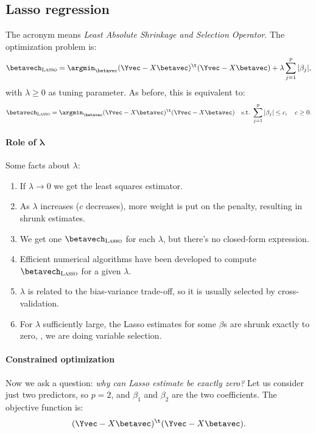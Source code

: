 \subsection{Lasso regression}

The acronym means \emph{Least Absolute Shrinkage and Selection Operator}. The optimization problem is:
\begin{equation}
    \betavech_{\textsc{Lasso}} = \argmin_{\betavec} {(\Yvec - X\betavec)^\t (\Yvec - X\betavec) + \lambda \sum_{j=1}^p |\beta_j|},
\end{equation}
with $\lambda \geq 0$ as tuning parameter. As before, this is equivalent to:
\begin{equation}
    \betavech_{\textsc{Lasso}} = \argmin_{\betavec} {(\Yvec - X\betavec)^\t (\Yvec - X\betavec)}\quad \text{s.t.\@ } \sum_{j=1}^p |\beta_j| \leq c, \quad c \geq 0.
\end{equation}

\paragraph{Role of $\bm{\lambda}$}

Some facts about $\lambda$:
\begin{enumerate}
    \item If $\lambda \to 0$ we get the least squares estimator.
    \item As $\lambda$ increases ($c$ decreases), more weight is put on the penalty, resulting in shrunk estimates.
    \item We get one $\betavech_{\textsc{Lasso}}$ for each $\lambda$, but there's no closed-form expression.
    \item Efficient numerical algorithms have been developed to compute $\betavech_{\textsc{Lasso}}$ for a given $\lambda$.
    \item $\lambda$ is related to the bias-variance trade-off, so it is usually selected by cross-validation.
    \item For $\lambda$ sufficiently large, the Lasso estimates for some $\beta$s are shrunk exactly to zero, \ie, we are doing variable selection.
\end{enumerate}

\paragraph{Constrained optimization}
Now we ask a question: \emph{why can Lasso estimate be exactly zero?}
Let us consider just two predictors, so $p = 2$, and $\beta_1$ and $\beta_2$ are the two coefficients. The objective function is:
\begin{equation}
    (\Yvec - X\betavec)^\t (\Yvec - X\betavec).
\end{equation}

